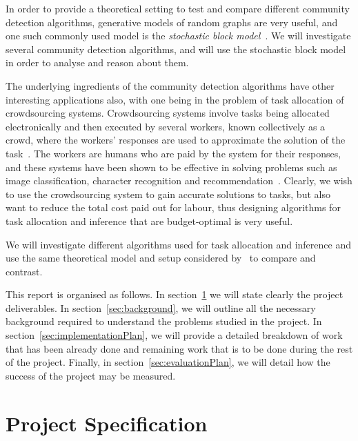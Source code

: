 \documentclass[11pt]{article}
\begin{document}
In order to provide a theoretical setting to test and compare different community detection algorithms, generative models of random graphs are very useful, and one such commonly used model is the \textit{stochastic block model}~\cite{DKM+13}. We will investigate several community detection algorithms, and will use the stochastic block model in order to analyse and reason about them.

The underlying ingredients of the community detection algorithms have other interesting applications also, with one being in the problem of task allocation of crowdsourcing systems. Crowdsourcing systems involve tasks being allocated electronically and then executed by several workers, known collectively as a crowd, where the workers' responses are used to approximate the solution of the task~\cite{KOS13,EHR12}. The workers are humans who are paid by the system for their responses, and these systems have been shown to be effective in solving problems such as image classification, character recognition and recommendation~\cite{KOS13}. Clearly, we wish to use the crowdsourcing system to gain accurate solutions to tasks, but also want to reduce the total cost paid out for labour, thus designing algorithms for task allocation and inference that are budget-optimal is very useful.

We will investigate different algorithms used for task allocation and inference and use the same theoretical model and setup considered by~\cite{KOS13} to compare and contrast.

This report is organised as follows. In section~\ref{sec:projectSpecification} we will state clearly the project deliverables. In section~\ref{sec:background}, we will outline all the necessary background required to understand the problems studied in the project. In section~\ref{sec:implementationPlan}, we will provide a detailed breakdown of work that has been already done and remaining work that is to be done during the rest of the project. Finally, in section~\ref{sec:evaluationPlan}, we will detail how the success of the project may be measured.


\newpage
\thispagestyle{plain}
\mbox{}
\section {Project Specification}
\label{sec:projectSpecification}
\end{document}
